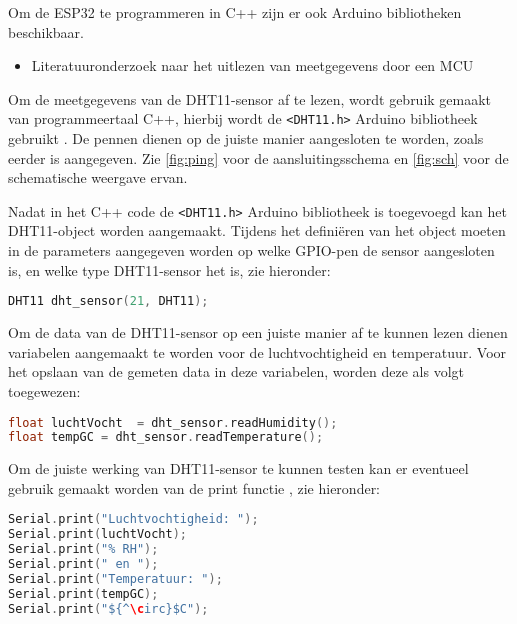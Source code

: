 Om de ESP32 te programmeren in C++ zijn er ook Arduino bibliotheken beschikbaar. 
\begin{itemize}
    \item[\ding{226}] Literatuuronderzoek naar het uitlezen van meetgegevens door een MCU
\end{itemize}
Om de meetgegevens van de DHT11-sensor af te lezen, wordt gebruik gemaakt van programmeertaal C++, hierbij wordt de \verb|<DHT11.h>| Arduino bibliotheek gebruikt \cite{Cameron2019}. 
De pennen dienen op de juiste manier aangesloten te worden, zoals eerder is aangegeven. 
Zie \autoref{fig:ping} voor de aansluitingsschema en \autoref{fig:sch} voor de schematische weergave ervan.

Nadat in het C++ code de \verb|<DHT11.h>| Arduino bibliotheek is toegevoegd kan het DHT11-object worden aangemaakt. 
Tijdens het definiëren van het object moeten in de parameters aangegeven worden op welke GPIO-pen de sensor aangesloten is, en welke type DHT11-sensor het is, zie hieronder: 
\begin{lstlisting}[language=C++]
DHT11 dht_sensor(21, DHT11);
\end{lstlisting}
Om de data van de DHT11-sensor op een juiste manier af te kunnen lezen dienen variabelen aangemaakt te worden voor de luchtvochtigheid en temperatuur. 
Voor het opslaan van de gemeten data in deze variabelen, worden deze als volgt toegewezen:
\begin{lstlisting}[language=C++]
float luchtVocht  = dht_sensor.readHumidity();
float tempGC = dht_sensor.readTemperature();
\end{lstlisting}

Om de juiste werking van DHT11-sensor te kunnen testen kan er eventueel gebruik gemaakt worden van de print functie \cite{6997578}, zie hieronder:
\begin{lstlisting}[mathescape, language=C++]
Serial.print("Luchtvochtigheid: ");
Serial.print(luchtVocht);
Serial.print("% RH");
Serial.print(" en ");
Serial.print("Temperatuur: ");
Serial.print(tempGC);
Serial.print("${^\circ}$C");
\end{lstlisting}

